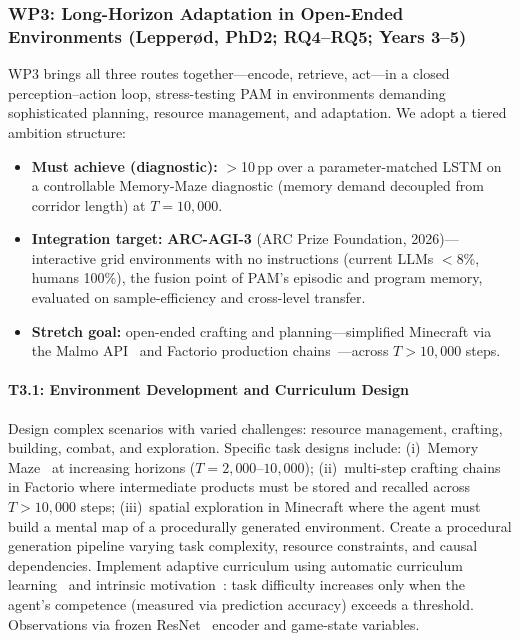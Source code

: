 \subsubsection*{WP3: Long-Horizon Adaptation in Open-Ended Environments \textnormal{(Lepperød, PhD2; RQ4--RQ5; Years 3--5)}}

WP3 brings all three routes together---encode, retrieve, act---in a closed perception--action loop, stress-testing PAM in environments demanding sophisticated planning, resource management, and adaptation. We adopt a tiered ambition structure:
\begin{itemize}[noitemsep,topsep=2pt]
  \item \textbf{Must achieve (diagnostic):} $>$10\,pp over a parameter-matched LSTM on a controllable Memory-Maze diagnostic (memory demand decoupled from corridor length) at $T{=}10{,}000$.
  \item \textbf{Integration target:} \textbf{ARC-AGI-3} (ARC Prize Foundation, 2026)---interactive grid environments with no instructions (current LLMs $<$8\%, humans 100\%), the fusion point of PAM's episodic and program memory, evaluated on sample-efficiency and cross-level transfer.
  \item \textbf{Stretch goal:} open-ended crafting and planning---simplified Minecraft via the Malmo API~\cite{johnson2016malmo} and Factorio production chains~\cite{kant2025factorio}---across $T{>}10{,}000$ steps.
\end{itemize}

\paragraph{T3.1: Environment Development and Curriculum Design}
Design complex scenarios with varied challenges: resource management, crafting, building, combat, and exploration. Specific task designs include: (i)~Memory Maze~\cite{pasukonis2022evaluating} at increasing horizons ($T{=}2{,}000$--$10{,}000$); (ii)~multi-step crafting chains in Factorio where intermediate products must be stored and recalled across $T{>}10{,}000$ steps; (iii)~spatial exploration in Minecraft where the agent must build a mental map of a procedurally generated environment. Create a procedural generation pipeline varying task complexity, resource constraints, and causal dependencies. Implement adaptive curriculum using automatic curriculum learning~\cite{portelas2020acl} and intrinsic motivation~\cite{aubret2023intrinsic}: task difficulty increases only when the agent's competence (measured via prediction accuracy) exceeds a threshold. Observations via frozen ResNet~\cite{he2016resnet} encoder and game-state variables.

